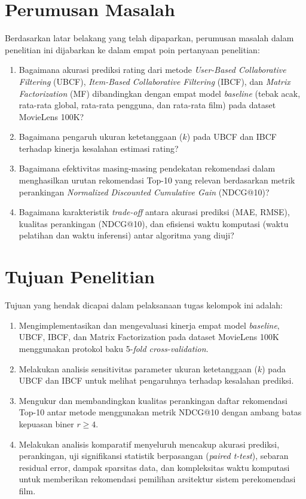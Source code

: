 \section{Perumusan Masalah}
Berdasarkan latar belakang yang telah dipaparkan, perumusan masalah dalam penelitian ini dijabarkan ke dalam empat poin pertanyaan penelitian:
\begin{enumerate}
    \item Bagaimana akurasi prediksi rating dari metode \textit{User-Based Collaborative Filtering} (UBCF), \textit{Item-Based Collaborative Filtering} (IBCF), dan \textit{Matrix Factorization} (MF) dibandingkan dengan empat model \textit{baseline} (tebak acak, rata-rata global, rata-rata pengguna, dan rata-rata film) pada dataset MovieLens 100K?
    \item Bagaimana pengaruh ukuran ketetanggaan ($k$) pada UBCF dan IBCF terhadap kinerja kesalahan estimasi rating?
    \item Bagaimana efektivitas masing-masing pendekatan rekomendasi dalam menghasilkan urutan rekomendasi Top-10 yang relevan berdasarkan metrik perankingan \textit{Normalized Discounted Cumulative Gain} (NDCG@10)?
    \item Bagaimana karakteristik \textit{trade-off} antara akurasi prediksi (MAE, RMSE), kualitas perankingan (NDCG@10), dan efisiensi waktu komputasi (waktu pelatihan dan waktu inferensi) antar algoritma yang diuji?
\end{enumerate}

\section{Tujuan Penelitian}
Tujuan yang hendak dicapai dalam pelaksanaan tugas kelompok ini adalah:
\begin{enumerate}
    \item Mengimplementasikan dan mengevaluasi kinerja empat model \textit{baseline}, UBCF, IBCF, dan Matrix Factorization pada dataset MovieLens 100K menggunakan protokol baku 5-\textit{fold cross-validation}.
    \item Melakukan analisis sensitivitas parameter ukuran ketetanggaan ($k$) pada UBCF dan IBCF untuk melihat pengaruhnya terhadap kesalahan prediksi.
    \item Mengukur dan membandingkan kualitas perankingan daftar rekomendasi Top-10 antar metode menggunakan metrik NDCG@10 dengan ambang batas kepuasan biner $r \ge 4$.
    \item Melakukan analisis komparatif menyeluruh mencakup akurasi prediksi, perankingan, uji signifikansi statistik berpasangan (\textit{paired t-test}), sebaran residual error, dampak sparsitas data, dan kompleksitas waktu komputasi untuk memberikan rekomendasi pemilihan arsitektur sistem perekomendasi film.
\end{enumerate}

